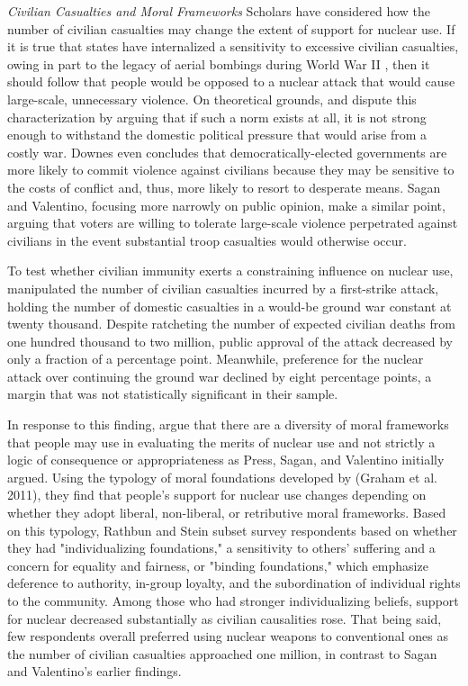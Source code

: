 \documentclass[12pt]{article}
\begin{document}
\textit{Civilian Casualties and Moral Frameworks}
\noindent
Scholars have considered how the number of civilian casualties may change the extent of support for nuclear use. If it is true that states have internalized a sensitivity to excessive civilian casualties, owing in part to the legacy of aerial bombings during World War II \citep{pinker_better_2011, thomas_ethics_2014}, then it should follow that people would be opposed to a nuclear attack that would cause large-scale, unnecessary violence. On theoretical grounds, \citet{downes_desperate_2006} and \citet{sagan_revisiting_2017} dispute this characterization by arguing that if such a norm exists at all, it is not strong enough to withstand the domestic political pressure that would arise from a costly war. Downes even concludes that democratically-elected governments are more likely to commit violence against civilians because they may be sensitive to the costs of conflict and, thus, more likely to resort to desperate means. Sagan and Valentino, focusing more narrowly on public opinion, make a similar point, arguing that voters are willing to tolerate large-scale violence perpetrated against civilians in the event substantial troop casualties would otherwise occur.

To test whether civilian immunity exerts a constraining influence on nuclear use, \citet{sagan_revisiting_2017} manipulated the number of civilian casualties incurred by a first-strike attack, holding the number of domestic casualties in a would-be ground war constant at twenty thousand. Despite ratcheting the number of expected civilian deaths from one hundred thousand to two million, public approval of the attack decreased by only a fraction of a percentage point. Meanwhile, preference for the nuclear attack over continuing the ground war declined by eight percentage points, a margin that was not statistically significant in their sample.

In response to this finding, \citet{rathbun_greater_2019} argue that there are a diversity of moral frameworks that people may use in evaluating the merits of nuclear use and not strictly a logic of consequence or appropriateness as Press, Sagan, and Valentino initially argued. Using the typology of moral foundations developed by (Graham et al. 2011), they find that people's support for nuclear use changes depending on whether they adopt liberal, non-liberal, or retributive moral frameworks. Based on this typology, Rathbun and Stein subset survey respondents based on whether they had "individualizing foundations," a sensitivity to others' suffering and a concern for equality and fairness, or "binding foundations," which emphasize deference to authority, in-group loyalty, and the subordination of individual rights to the community. Among those who had stronger individualizing beliefs, support for nuclear decreased substantially as civilian causalities rose. That being said, few respondents overall preferred using nuclear weapons to conventional ones as the number of civilian casualties approached one million, in contrast to Sagan and Valentino's earlier findings.
\end{document}
